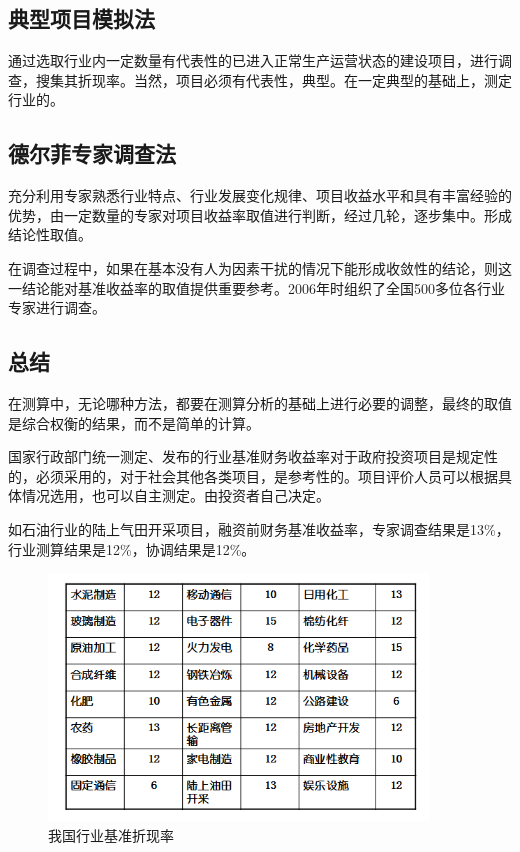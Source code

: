 \subsection{典型项目模拟法}
通过选取行业内一定数量有代表性的已进入正常生产运营状态的建设项目，进行调查，搜集其折现率。当然，项目必须有代表性，典型。在一定典型的基础上，测定行业的。

\subsection{德尔菲专家调查法}
充分利用专家熟悉行业特点、行业发展变化规律、项目收益水平和具有丰富经验的优势，由一定数量的专家对项目收益率取值进行判断，经过几轮，逐步集中。形成结论性取值。

在调查过程中，如果在基本没有人为因素干扰的情况下能形成收敛性的结论，则这一结论能对基准收益率的取值提供重要参考。2006年时组织了全国500多位各行业专家进行调查。

\subsection{总结}
在测算中，无论哪种方法，都要在测算分析的基础上进行必要的调整，最终的取值是综合权衡的结果，而不是简单的计算。

国家行政部门统一测定、发布的行业基准财务收益率对于政府投资项目是规定性的，必须采用的，对于社会其他各类项目，是参考性的。项目评价人员可以根据具体情况选用，也可以自主测定。由投资者自己决定。

如石油行业的陆上气田开采项目，融资前财务基准收益率，专家调查结果是13\%，行业测算结果是12\%，协调结果是12\%。

\begin{figure}[H]
    \centering
    \includegraphics[width=0.9\textwidth]{image/我国行业基准折现率.png}
    \caption{我国行业基准折现率}
    \label{fig:12}
\end{figure}
